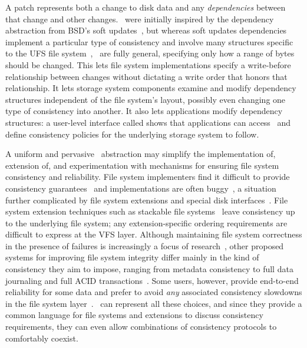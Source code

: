 A patch represents both a change to disk data and any \emph{dependencies}
 between that change and other changes. 
%
\Patches\ were initially inspired by the dependency abstraction from BSD's soft
 updates~\cite{ganger00soft}, but whereas soft updates dependencies
 implement a particular type of consistency
 and involve many structures specific to the UFS file
 system~\cite{mckusick99soft}, \patches\ are fully general,
 specifying only how a range of bytes should be changed.
%
This lets file system implementations specify a
 write-before relationship between changes without dictating
 a write order that honors that relationship.
%
It lets storage system components examine and
 modify dependency structures independent of the file system's layout,
 possibly even changing one type of consistency into another.
%
It also lets applications modify dependency structures: a
 user-level interface called \emph{\patchgroups} shows that applications
 can access \patches\ and define consistency policies for the underlying
 storage system to follow.


A uniform and pervasive \patch\ abstraction may simplify the
 implementation of, extension of, and experimentation with mechanisms for
 ensuring file system consistency and reliability.
%
File system implementers find it difficult to provide
 consistency guarantees~\cite{tweedie98journaling,mckusick99soft}
 and implementations are often buggy~\cite{yang04using,yang06explode},
 a situation further complicated by file system extensions and
 special disk interfaces~\cite{soules03metadata,fast04versionfs,quinlan02venti,cornell04wayback,wright03ncryptfs,sivathanu03semantically-smart,sivathanu05database-aware}.
%
File system extension techniques such as stackable file
 systems~\cite{zadok00fist,zadok99extending,heidemann94filesystem,rosenthal90evolving}
 leave consistency up to the underlying file system; any extension-specific
 ordering requirements are difficult to express at the VFS layer.
%
Although maintaining file system
 correctness in the presence of failures is increasingly a focus of
 research~\cite{sivathanuetal05-logic,denehyetal05-journal-guided},
%
other proposed systems for improving file system integrity
 differ mainly in the kind of consistency they aim to impose, ranging from
 metadata consistency to full data journaling and full ACID
 transactions~\cite{gal05transactional,liskov04transactional}.
%
Some users, however, provide end-to-end reliability for some data
 and prefer to avoid \emph{any} associated consistency
 slowdowns in the file system layer~\cite{googleext2}.
%
\Patches\ can represent all these choices, and since they provide a common
 language for file systems and extensions to discuss consistency
 requirements, they can even allow combinations of consistency protocols to
 comfortably coexist.


